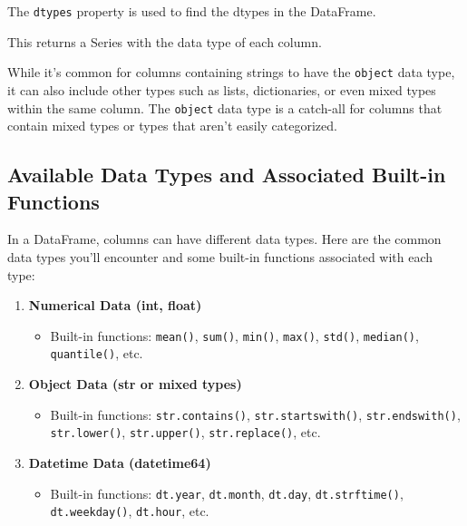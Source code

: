 \documentclass[
  letterpaper,
  DIV=11,
  numbers=noendperiod]{scrreprt}
\providecommand{\tightlist}{%
  \setlength{\itemsep}{0pt}\setlength{\parskip}{0pt}}\usepackage{longtable,booktabs,array}
\begin{document}
The \texttt{dtypes} property is used to find the dtypes in the
DataFrame.

This returns a Series with the data type of each column.

While it's common for columns containing strings to have the
\texttt{object} data type, it can also include other types such as
lists, dictionaries, or even mixed types within the same column. The
\texttt{object} data type is a catch-all for columns that contain mixed
types or types that aren't easily categorized.

\hypertarget{available-data-types-and-associated-built-in-functions}{%
\subsection{Available Data Types and Associated Built-in
Functions}\label{available-data-types-and-associated-built-in-functions}}

In a DataFrame, columns can have different data types. Here are the
common data types you'll encounter and some built-in functions
associated with each type:

\begin{enumerate}
\def\labelenumi{\arabic{enumi}.}
\tightlist
\item
  \textbf{Numerical Data (int, float)}

  \begin{itemize}
  \tightlist
  \item
    Built-in functions: \texttt{mean()}, \texttt{sum()}, \texttt{min()},
    \texttt{max()}, \texttt{std()}, \texttt{median()},
    \texttt{quantile()}, etc.
  \end{itemize}
\item
  \textbf{Object Data (str or mixed types)}

  \begin{itemize}
  \tightlist
  \item
    Built-in functions: \texttt{str.contains()},
    \texttt{str.startswith()}, \texttt{str.endswith()},
    \texttt{str.lower()}, \texttt{str.upper()}, \texttt{str.replace()},
    etc.
  \end{itemize}
\item
  \textbf{Datetime Data (datetime64)}

  \begin{itemize}
  \tightlist
  \item
    Built-in functions: \texttt{dt.year}, \texttt{dt.month},
    \texttt{dt.day}, \texttt{dt.strftime()}, \texttt{dt.weekday()},
    \texttt{dt.hour}, etc.
  \end{itemize}
\end{enumerate}
\end{document}
